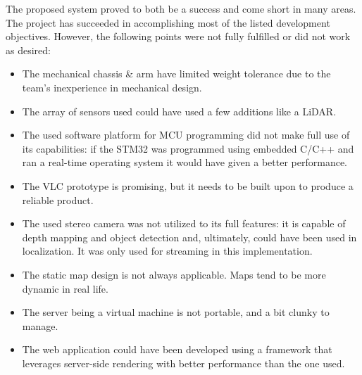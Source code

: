 The proposed system proved to both be a success and come short in many areas. The project has succeeded in accomplishing most of the listed development objectives. However, the following points were not fully fulfilled or did not work as desired:
\begin{itemize}
	\item The mechanical chassis \& arm have limited weight tolerance due to the team's inexperience in mechanical design.
	\item The array of sensors used could have used a few additions like a LiDAR.
	\item The used software platform for MCU programming did not make full use of its capabilities: if the STM32 was programmed using embedded C/C++ and ran a real-time operating system it would have given a better performance.
	\item The VLC prototype is promising, but it needs to be built upon to produce a reliable product.
	\item The used stereo camera was not utilized to its full features: it is capable of depth mapping and object detection and, ultimately, could have been used in localization. It was only used for streaming in this implementation.
	\item The static map design is not always applicable. Maps tend to be more dynamic in real life.
	\item The server being a virtual machine is not portable, and a bit clunky to manage.
	\item The web application could have been developed using a framework that leverages server-side rendering with better performance than the one used.
\end{itemize} 

\newpage


